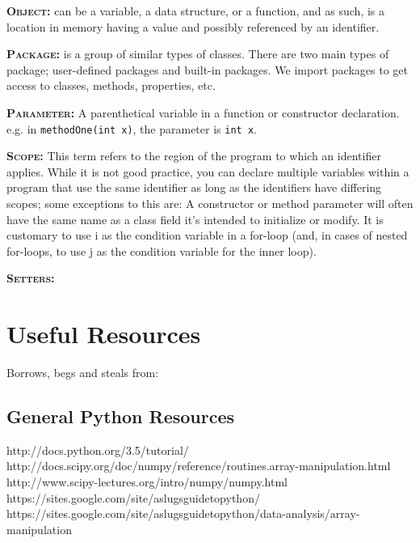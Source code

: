 \documentclass[11pt,a4paper]{article}
\begin{document}
\smallskip \smallskip
\noindent \textbf{\textsc{Object:}} can be a variable, a data
structure, or a function, and as such, is a location in memory having
a value and possibly referenced by an identifier.

\smallskip \smallskip
\noindent \textbf{\textsc{Package:}} is a group of similar types of
classes. There are two main types of package; user-defined packages
and built-in packages. We import packages to get access to classes, 
methods, properties, etc. 

\smallskip \smallskip
\noindent \textbf{\textsc{Parameter:}} A parenthetical variable in a
function or constructor declaration. e.g. in {\tt methodOne(int x)},
the parameter is {\tt int x}.

\smallskip \smallskip
\noindent \textbf{\textsc{Scope:}} This term refers to the region of
the program to which an identifier applies. While it is not good
practice, you can declare multiple variables within a program that use
the same identifier as long as the identifiers have differing scopes;
some exceptions to this are: A constructor or method parameter will
often have the same name as a class field it's intended to initialize
or modify.  It is customary to use i as the condition variable in a
for-loop (and, in cases of nested for-loops, to use j as the condition
variable for the inner loop).

\smallskip \smallskip
\noindent \textbf{\textsc{Setters:}}





\newpage
\section{Useful Resources}
Borrows, begs and steals from: \\

\subsection*{General Python Resources}
http://docs.python.org/3.5/tutorial/\\
http://docs.scipy.org/doc/numpy/reference/routines.array-manipulation.html\\
http://www.scipy-lectures.org/intro/numpy/numpy.html\\
https://sites.google.com/site/aslugsguidetopython/\\
https://sites.google.com/site/aslugsguidetopython/data-analysis/array-manipulation\\
\end{document}

